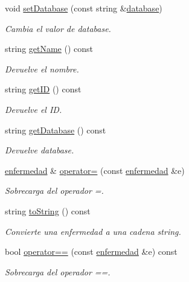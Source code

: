 \begin{DoxyCompactItemize}
void \hyperlink{classenfermedad_ac1f009307d52232420a72264e9c2ce3f}{set\-Database} (const string \&\hyperlink{classenfermedad_a3684b7ec850d4c9357dd21bdd5e02803}{database})
\begin{DoxyCompactList}\small\item\em Cambia el valor de database. \end{DoxyCompactList}\item 
string \hyperlink{classenfermedad_ab22f6f0140a5fe5a331d72920d95f55b}{get\-Name} () const 
\begin{DoxyCompactList}\small\item\em Devuelve el nombre. \end{DoxyCompactList}\item 
string \hyperlink{classenfermedad_aaf9b9135b1d4efda7dc61856fce1b7b2}{get\-I\-D} () const 
\begin{DoxyCompactList}\small\item\em Devuelve el I\-D. \end{DoxyCompactList}\item 
string \hyperlink{classenfermedad_a79d304a2e39ea391917744fd4d8f168d}{get\-Database} () const 
\begin{DoxyCompactList}\small\item\em Devuelve database. \end{DoxyCompactList}\item 
\hyperlink{classenfermedad}{enfermedad} \& \hyperlink{classenfermedad_a795be16b7e3e6a858211ff20a62c9d85}{operator=} (const \hyperlink{classenfermedad}{enfermedad} \&e)
\begin{DoxyCompactList}\small\item\em Sobrecarga del operador =. \end{DoxyCompactList}\item 
string \hyperlink{classenfermedad_a044425928b4f7fa6a398cf2486260b23}{to\-String} () const 
\begin{DoxyCompactList}\small\item\em Convierte una enfermedad a una cadena string. \end{DoxyCompactList}\item 
bool \hyperlink{classenfermedad_ac2786ad7be914729516dd15611532fbb}{operator==} (const \hyperlink{classenfermedad}{enfermedad} \&e) const 
\begin{DoxyCompactList}\small\item\em Sobrecarga del operador ==. \end{DoxyCompactList}\item 

\end{DoxyCompactItemize}
